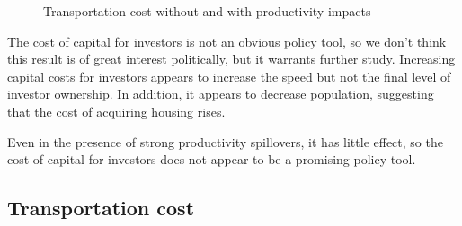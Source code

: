 \begin{figure}[h!tb]
    \caption{Transportation cost without and with productivity impacts}
    \label{fig:Productivity_link_W-WO-Cost-of-capital}
\end{figure}
The cost of capital for investors is not an obvious policy tool, so we don't think this result is of great interest politically, but it warrants further study. Increasing capital costs for investors appears to increase the speed but not the final level of investor ownership.  In addition, it appears to decrease population, suggesting that the cost of acquiring housing rises. 

Even in the presence of strong productivity spillovers, it has little effect, so the cost of capital for investors does not appear to be a promising policy tool.

\newpage
\subsection{Transportation cost}
